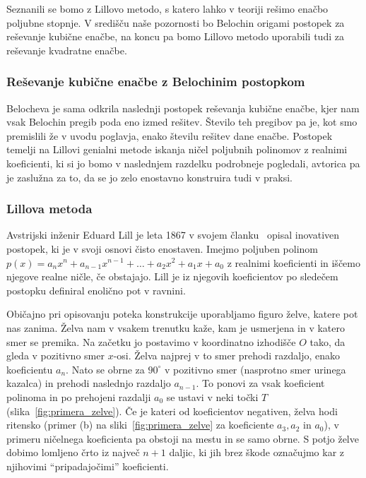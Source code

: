 Seznanili se bomo z Lillovo metodo, s katero lahko v teoriji rešimo enačbo poljubne stopnje. V središču naše pozornosti bo Belochin origami postopek za reševanje kubične enačbe, na koncu pa bomo Lillovo metodo uporabili tudi za reševanje kvadratne enačbe.

\subsubsection{Reševanje kubične enačbe z Belochinim postopkom}

Belocheva je sama odkrila naslednji postopek reševanja kubične enačbe, kjer nam vsak Belochin pregib poda eno izmed rešitev. Število teh pregibov pa je, kot smo premislili že v uvodu poglavja, enako številu rešitev dane enačbe. Postopek temelji na Lillovi genialni metode iskanja ničel poljubnih polinomov z realnimi koeficienti, ki si jo bomo v naslednjem razdelku podrobneje pogledali, avtorica pa je zaslužna za to, da se jo zelo enostavno konstruira tudi v praksi.

\subsubsection*{Lillova metoda}

Avstrijski inženir Eduard Lill je leta 1867 v svojem članku~\cite{lill1867} opisal inovativen postopek, ki je v svoji osnovi čisto enostaven. Imejmo poljuben polinom $ p(x) = a_n x^n + a_{n-1} x^{n-1} + \ldots + a_2 x^2 + a_1 x + a_0 $ z realnimi koeficienti in iščemo njegove realne ničle, če obstajajo. Lill je iz njegovih koeficientov po sledečem postopku definiral enolično pot v ravnini. 

Običajno pri opisovanju poteka konstrukcije uporabljamo figuro želve, katere pot nas zanima. Želva nam v vsakem trenutku kaže, kam je usmerjena in v katero smer se premika. Na začetku jo postavimo v koordinatno izhodišče $O$ tako, da gleda v pozitivno smer $x$-osi. Želva najprej v to smer prehodi razdaljo, enako koeficientu $a_n$. Nato se obrne za $90^\circ$ v pozitivno smer (nasprotno smer urinega kazalca) in prehodi naslednjo razdaljo $a_{n-1}$. To ponovi za vsak koeficient polinoma in po prehojeni razdalji $a_0$ se ustavi v neki točki $T$ (slika~\ref{fig:primera_zelve}). Če je kateri od koeficientov negativen, želva hodi ritensko (primer (b) na sliki~\ref{fig:primera_zelve} za koeficiente $a_3, a_2$ in $a_0$), v primeru ničelnega koeficienta pa obstoji na mestu in se samo obrne. S potjo želve dobimo lomljeno črto iz največ $n+1$ daljic, ki jih brez škode označujmo kar z njihovimi ``pripadajočimi'' koeficienti.

